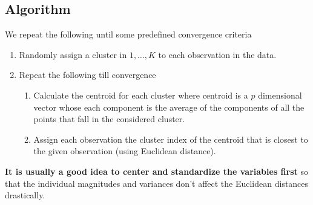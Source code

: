 \documentclass[../statistical_learning_notes.tex]{subfiles}
\begin{document}
    \subsection{Algorithm}
    We repeat the following until some predefined convergence criteria
    \begin{enumerate}
        \item Randomly assign a cluster in $1, \ldots, K$ to each observation in the data.
        \item Repeat the following till convergence
        \begin{enumerate}
            \item Calculate the centroid for each cluster where centroid is a $p$ dimensional vector whose each component is the average of the components of all the points that fall in the considered cluster.
            \item Assign each observation the cluster index of the centroid that is closest to the given observation (using Euclidean distance).
        \end{enumerate}
    \end{enumerate}

    \textbf{It is usually a good idea to center and standardize the variables first} so that the individual magnitudes and variances don't affect the Euclidean distances drastically.
\end{document}
